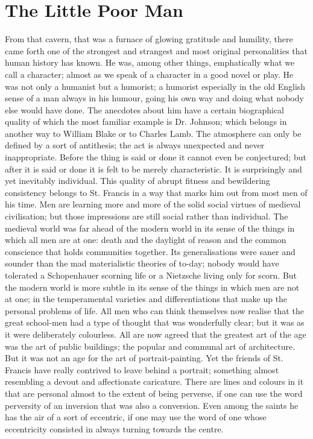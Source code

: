 \documentclass{book}
\begin{document}
\chapter{The Little Poor Man}
\label{chapter-5}
From that cavern, that was a furnace of glowing gratitude and humility, there came forth one of the strongest and strangest and most original personalities that human history has known. He was, among other things, emphatically what we call a character; almost as we speak of a character in a good novel or play. He was not only a humanist but a humorist; a humorist especially in the old English sense of a man always in his humour, going his own way and doing what nobody else would have done. The anecdotes about him have a certain biographical quality of which the most familiar example is Dr. Johnson; which belongs in another way to William Blake or to Charles Lamb. The atmosphere can only be defined by a sort of antithesis; the act is always unexpected and never inappropriate. Before the thing is said or done it cannot even be conjectured; but after it is said or done it is felt to be merely characteristic. It is surprisingly and yet inevitably individual. This quality of abrupt fitness and bewildering consistency belongs to St. Francis in a way that marks him out from most men of his time. Men are learning more and more of the solid social virtues of medieval civilisation; but those impressions are still social rather than individual. The medieval world was far ahead of the modern world in its sense of the things in which all men are at one: death and the daylight of reason and the common conscience that holds communities together. Its generalisations were saner and sounder than the mad materialistic theories of to-day; nobody would have tolerated a Schopenhauer scorning life or a Nietzsche living only for scorn. But the modern world is more subtle in its sense of the things in which men are not at one; in the temperamental varieties and differentiations that make up the personal problems of life. All men who can think themselves now realise that the great school-men had a type of thought that was wonderfully clear; but it was as it were deliberately colourless. All are now agreed that the greatest art of the age was the art of public buildings; the popular and communal art of architecture. But it was not an age for the art of portrait-painting. Yet the friends of St. Francis have really contrived to leave behind a portrait; something almost resembling a devout and affectionate caricature. There are lines and colours in it that are personal almost to the extent of being perverse, if one can use the word perversity of an inversion that was also a conversion. Even among the saints he has the air of a sort of eccentric, if one may use the word of one whose eccentricity consisted in always turning towards the centre.
\end{document}
